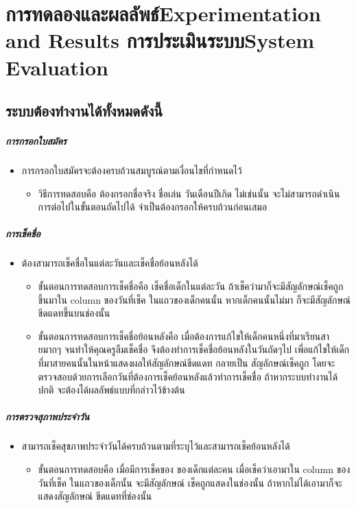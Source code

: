\chapter{\ifproject%
\ifcpe การทดลองและผลลัพธ์\else Experimentation and Results\fi
\else%
\ifcpe การประเมินระบบ\else System Evaluation\fi
\fi}


\section{ระบบต้องทำงานได้ทั้งหมดดังนี้}
\paragraph{การกรอกใบสมัคร}
\begin{itemize}
    \item การกรอกใบสมัครจะต้องครบถ้วนสมบูรณ์ตามเงื่อนไขที่กำหนดไว้
    \begin{itemize}
        \item วิธีการทดสอบคือ ต้องกรอกชื่อจริง ชื่อเล่น วันเดือนปีเกิด ไม่เช่นนั้น จะไม่สามารถดำเนินการต่อไปในขั้นตอนถัดไปได้ จำเป็นต้องกรอกให้ครบถ้วนก่อนเสมอ
    \end{itemize}
\end{itemize}
\paragraph{การเช็คชื่อ}
\begin{itemize}
    \item ต้องสามารถเช็คชื่อในแต่ละวันและเช็คชื่อย้อนหลังได้
    \begin{itemize}
        \item ขั้นตอนการทดสอบการเช็คชื่อคือ เช็คชื่อเด็กในแต่ละวัน  ถ้าเช็คว่ามาก็จะมีสัญลักษณ์เช็คถูกขึ้นมาใน column ของวันที่เช็ค ในแถวของเด็กคนนั้น  หากเด็กคนนั้นไม่มา ก็จะมีสัญลักษณ์ขีดแดทขึ้นบนช่องนั้น
        \item ขั้นตอนการทดสอบการเช็คชื่อย้อนหลังคือ  เมื่อต้องการแก้ไขให้เด็กคนหนึ่งที่มาเรียนสายมากๆ  จนทำให้คุณครูลืมเช็คชื่อ  จึงต้องทำการเช็คชื่อย้อนหลังในวันถัดๆไป  เพื่อแก้ไขให้เด็กที่มาสายคนนั้นในหน้าแสดงผลให้สัญลักษณ์ขีดแดท กลายเป็น สัญลักษณ์เช็คถูก  โดยจะตรวจสอบด้วยการเลือกวันที่ต้องการเช็คย้อนหลังแล้วทำการเช็คชื่อ  ถ้าหากระบบทำงานได้ปกติ  จะต้องได้ผลลัพธ์แบบที่กล่าวไว้ข้างต้น
    \end{itemize}
\end{itemize}
\paragraph{การตรวจสุภาพประจำวัน}
\begin{itemize}
    \item สามารถเช็คสุขภาพประจำวันได้ครบถ้วนตามที่ระบุไว้และสามารถเช็คย้อนหลังได้
    \begin{itemize}
        \item ขั้นตอนการทดสอบคือ เมื่อมีการเช็คของ ของเด็กแต่ละคน  เมื่อเช็คว่าเอามาใน column ของวันที่เช็ค ในแถวของเด็กนั้น จะมีสัญลักษณ์ เช็คถูกแสดงในช่องนั้น  ถ้าหากไม่ได้เอามาก็จะแสดงสัญลักษณ์ ขีดแดทที่ช่องนั้น
    \end{itemize}
\end{itemize}
